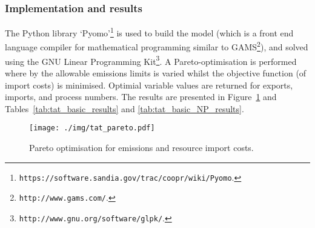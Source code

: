 \subsubsection*{Implementation and results}
The Python library `Pyomo'\footnote{\texttt{https://software.sandia.gov/trac/coopr/wiki/Pyomo}.} is used to build the model (which is a front end language compiler for mathematical programming similar to GAMS\footnote{\texttt{http://www.gams.com/}.}), and solved using the GNU Linear Programming Kit\footnote{\texttt{http://www.gnu.org/software/glpk/}.}. A Pareto-optimisation is performed where by the allowable emissions limits is varied whilst the objective function (of import costs) is minimised. Optimial variable values are returned for exports, imports, and process numbers. The results are presented in Figure~\ref{fig:tat_pareto} and Tables~\ref{tab:tat_basic_results} and \ref{tab:tat_basic_NP_results}.
\begin{figure}
	\centering
	\texttt{[image: ./img/tat\_pareto.pdf]}
	\caption{Pareto optimisation for emissions and resource import costs.} \label{fig:tat_pareto}
\end{figure}
 
 

